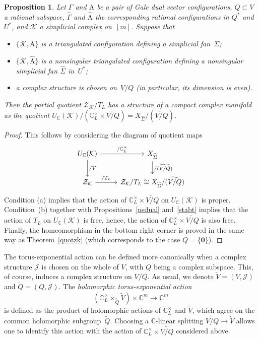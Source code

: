 \documentclass[a4paper]{amsart}
\newtheorem{proposition}[theorem]{Proposition}
\theoremstyle{definition}
\theoremstyle{remark}
\numberwithin{equation}{section}
\def\C{\mathbb C}
\def\sK{\mathcal K}
\newcommand{\zk}{\mathcal Z_{\mathcal K}}
\newcommand{\<}{\langle}
\renewcommand{\>}{\rangle}
\begin{document}
\begin{proposition}\label{holpq1}
Let $\Gamma$ and $\mathrm A$ be a pair of Gale dual vector configurations,  $Q\subset V$ a rational subspace, $\widehat\Gamma$ and $\widehat{\mathrm A}$ the corresponding rational configurations in $Q^*$ and $U^*$, and $\sK$ a simplicial complex on~$[m]$. Suppose that 
\begin{itemize}
\item[(a)]
$\{\sK,\mathrm A\}$ is a triangulated configuration defining a simplicial fan~$\Sigma$;

\item[(b)]
$\{\sK,\widehat{\mathrm A}\}$ is a nonsingular triangulated configuration defining a nonsingular simplicial fan $\widehat\Sigma$ in~$U^*$;

\item[(c)]
a complex structure is chosen on~$V/Q$ (in particular, its dimension is even).
\end{itemize}
Then the partial quotient $\zk/T_L$ has a structure of a compact complex manifold as the quotient $U_\C(\sK)/(\C^\times_L\times\widetilde{V/Q})=
X_{\widehat\Sigma}/(\widetilde{V/Q})$.
\end{proposition}
\begin{proof}
This follows by considering the diagram of quotient maps
\[
\begin{tikzcd}
  U_\C(\sK) \ar{r}{/\C^\times_L} \ar{d}{/V} 
   & X_{\widehat\Sigma} \ar{d}{/(\widetilde{V/Q})}\\
  \zk \ar{r}{/T_L} & \zk/T_L\cong X_{\widehat\Sigma}/(\widetilde{V/Q})
\end{tikzcd}
\]
Condition (a) implies that the action of $\C^\times_L\times\widetilde{V/Q}$ on $U_\C(\sK)$ is proper. Condition~(b) together with Propositions~\ref{nsdual} and~\ref{stabt} implies that the action of $T_L$ on $U_\C(\sK)$ is free, hence, the action of $\C^\times_L\times\widetilde{V/Q}$ is also free. Finally, the homeomorphism in the bottom right corner is proved in the same way as Theorem~\ref{quotzk} (which corresponds to the case $Q=\{\mathbf 0\}$).
\end{proof}

The torus-exponential action can be defined more canonically when a complex structure $\mathcal J$ is chosen on the whole of $V$, with $Q$ being a complex subspace. This, of course, induces a complex structure on $V/Q$. As usual, we denote $\widetilde V=(V,\mathcal J)$ and $\widetilde Q=(Q,\mathcal J)$. The \emph{holomorphic torus-exponential action} 
\[
  (\C^\times_L\times_{\widetilde Q}\widetilde V)\times\C^m\to\C^m
\]  
is defined as the product of holomorphic actions of $\C^\times_L$ and $\widetilde V$, which agree on the common holomorphic subgroup~$\widetilde Q$. Choosing a 
$\C$-linear splitting $\widetilde{V/Q}\to\widetilde V$ allows one to identify this action with the action of $\C^\times_L\times\widetilde{V/Q}$ considered above.
\end{document}
